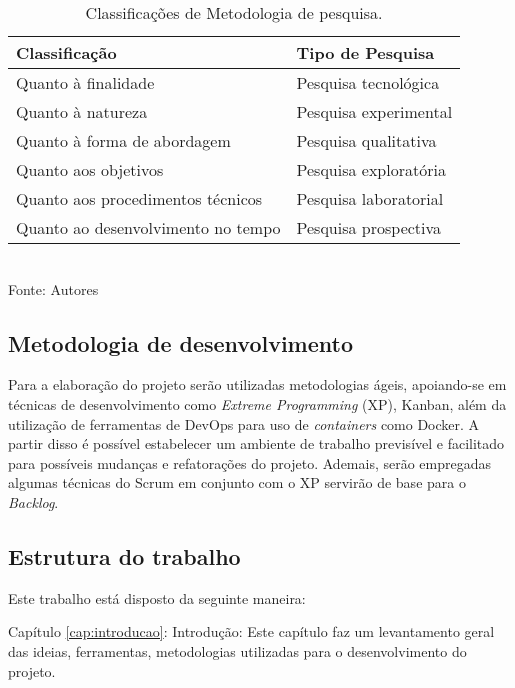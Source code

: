 \begin{table}
    \centering
    \caption{Classificações de Metodologia de pesquisa.}
    \begin{tabular}{|l|l|}
        \hline
        \textbf{Classificação}            & \textbf{Tipo de Pesquisa}\\ 
        \hline
        Quanto à finalidade               & Pesquisa tecnológica \\ 
        \hline
        Quanto à natureza                 & Pesquisa experimental \\ 
        \hline
        Quanto à forma de abordagem       & Pesquisa qualitativa \\
        \hline
        Quanto aos objetivos              & Pesquisa exploratória \\
        \hline
        Quanto aos procedimentos técnicos & Pesquisa laboratorial \\        
        \hline
        Quanto ao desenvolvimento no tempo & Pesquisa prospectiva \\
        \hline   
    \end{tabular}
    \label{tab:tipo_pesquisa}
    \vspace{5mm} \\ 
    {\footnotesize Fonte: Autores}
\end{table}

\subsection{Metodologia de desenvolvimento}

Para a elaboração do projeto serão utilizadas metodologias ágeis, apoiando-se em técnicas de desenvolvimento como \textit{Extreme Programming} (XP), Kanban, além da utilização de ferramentas de DevOps para uso de \textit{containers} como Docker. A partir disso é possível estabelecer um ambiente de trabalho previsível e facilitado para possíveis mudanças e refatorações do projeto. Ademais, serão empregadas algumas técnicas do Scrum em conjunto com o XP servirão de base para o \textit{Backlog}.

\subsection{Estrutura do trabalho}

Este trabalho está disposto da seguinte maneira:

Capítulo \ref{cap:introducao}: Introdução: Este capítulo faz um levantamento geral das ideias, ferramentas, metodologias utilizadas para o desenvolvimento do projeto.

